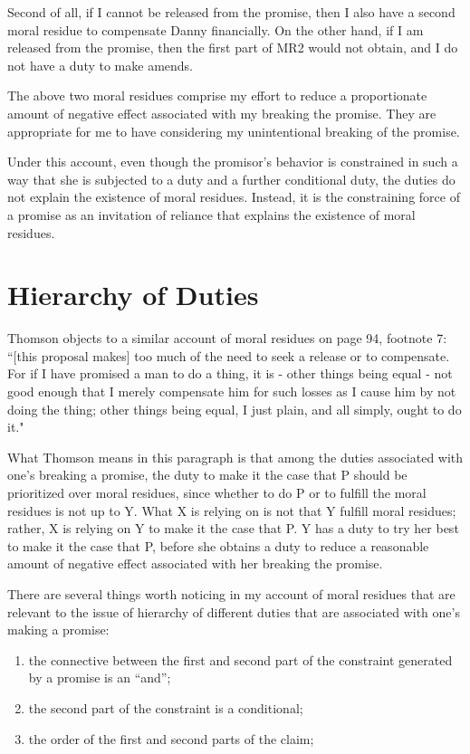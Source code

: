 Second of all, if I cannot be released from the promise, then I also
have a second moral residue to compensate Danny financially. On the
other hand, if I am released from the promise, then the first part of
MR2 would not obtain, and I do not have a duty to make amends.

The above two moral residues comprise my effort to reduce a
proportionate amount of negative effect associated with my breaking the
promise. They are appropriate for me to have considering my
unintentional breaking of the promise.

Under this account, even though the promisor's behavior is constrained
in such a way that she is subjected to a duty and a further conditional
duty, the duties do not explain the existence of moral residues.
Instead, it is the constraining force of a promise as an invitation of
reliance that explains the existence of moral residues.

\section{Hierarchy of Duties}

Thomson objects to a similar account of moral residues on page 94,
footnote 7: ``[this proposal makes] too much of the need to seek a
release or to compensate. For if I have promised a man to do a thing, it
is - other things being equal - not good enough that I merely compensate
him for such losses as I cause him by not doing the thing; other things
being equal, I just plain, and all simply, ought to do it."

What Thomson means in this paragraph is that among the duties associated
with one's breaking a promise, the duty to make it the case that P
should be prioritized over moral residues, since whether to do P or to
fulfill the moral residues is not up to Y. What X is relying on is not
that Y fulfill moral residues; rather, X is relying on Y to make it the
case that P. Y has a duty to try her best to make it the case that P,
before she obtains a duty to reduce a reasonable amount of negative
effect associated with her breaking the promise.

There are several things worth noticing in my account of moral residues
that are relevant to the issue of hierarchy of different duties that are
associated with one's making a promise:

\begin{enumerate}
\def\labelenumi{\alph{enumi}.}
\item
  the connective between the first and second part of the constraint
  generated by a promise is an ``and'';
\item
  the second part of the constraint is a conditional;
\item
  the order of the first and second parts of the claim;
\end{enumerate}

